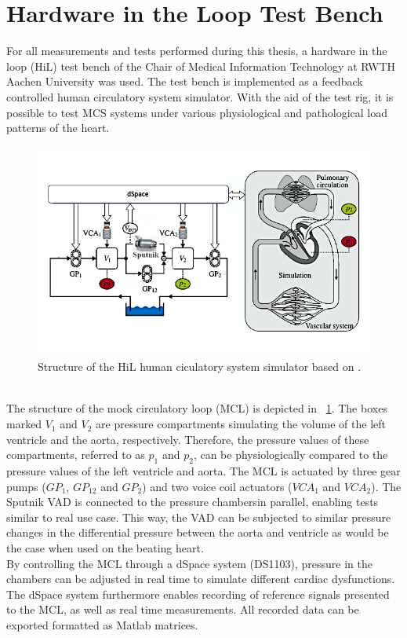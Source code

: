 \section{Hardware in the Loop Test Bench}
For all measurements and tests performed during this thesis, a hardware in the loop (HiL) test bench of the Chair of Medical Information Technology at RWTH Aachen University was used. The test bench is implemented as a feedback controlled human circulatory system simulator. With the aid of the test rig, it is possible to test MCS systems under various physiological and pathological load patterns of the heart.
\begin{figure}[ht]
  \centering
  \includegraphics[width=\textwidth]{images/mock_loop.jpg}
  \caption[HiL test bench]{Structure of the HiL human ciculatory system simulator based on \cite{MCL}.}
  \label{fig:mock_loop}
\end{figure}
\\The structure of the mock circulatory loop (MCL) is depicted in \figurename~\ref{fig:mock_loop}. The boxes marked $V_{1}$ and $V_{2}$ are pressure compartments simulating the volume of the left ventricle and the aorta, respectively. Therefore, the pressure values of these compartments, referred to as $p_{1}$ and $p_{2}$, can be physiologically compared to the pressure values of the left ventricle and aorta. The MCL is actuated by three gear pumps ($GP_{1}$, $GP_{12}$ and $GP_{2}$) and two voice coil actuators ($VCA_{1}$ and $VCA_{2}$). The Sputnik VAD is connected to the pressure chambersin parallel, enabling tests similar to real use case. This way, the VAD can be subjected to similar pressure changes in the differential pressure between the aorta and ventricle as would be the case when used on the beating heart.
\\By controlling the MCL through a dSpace system (DS1103), pressure in the chambers can be adjusted in real time to simulate different cardiac dysfunctions. The dSpace system furthermore enables recording of reference signals presented to the MCL, as well as real time measurements. All recorded data can be exported formatted as Matlab matrices.
